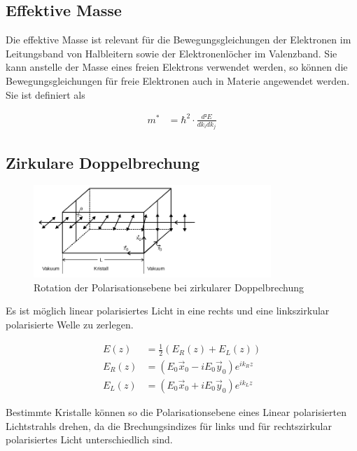 \subsection{Effektive Masse \cite[][Kap. 14]{book:expi3}}

Die effektive Masse ist relevant für die Bewegungsgleichungen der Elektronen im
Leitungsband von Halbleitern sowie der Elektronenlöcher im Valenzband. Sie kann
anstelle der Masse eines freien Elektrons verwendet werden, so können die
Bewegungsgleichungen für freie Elektronen auch in Materie angewendet werden.
Sie ist definiert als

\begin{align}
	m^* & = \hbar^2 \cdot \frac{d²E}{d k_i d k_j}
\end{align}

\subsection{Zirkulare Doppelbrechung \cite{man_a}}
\begin{figure}[H]
	\centering
	\includegraphics[width=0.8\textwidth]{./Bilder/zirpol.png}
	\caption{Rotation der Polarisationsebene bei zirkularer Doppelbrechung \cite{man_a} }\label{fig:zirpol}
\end{figure}

Es ist möglich linear polarisiertes Licht in eine rechts und eine linkszirkular
polarisierte Welle zu zerlegen.

\begin{align}
	E(z)    & = \frac{1}{2}(E_R(z) + E_L(z))                   \\
	E_R (z) & = (E_0 \vec{x}_0  - i E_0 \vec{y}_0) e^{i k_R z} \\
	E_L (z) & = (E_0 \vec{x}_0  + i E_0 \vec{y}_0) e^{i k_L z}
\end{align}

Bestimmte Kristalle können so die Polarisationsebene eines Linear polarisierten
Lichtstrahls drehen, da die Brechungsindizes für links und für rechtszirkular
polarisiertes Licht unterschiedlich sind.

